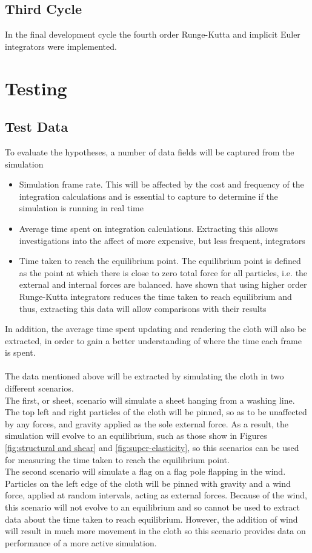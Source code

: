 \subsection{Third Cycle}
In the final development cycle the fourth order Runge-Kutta and implicit Euler integrators were implemented.

\section{Testing}

\subsection{Test Data}
To evaluate the hypotheses, a number of data fields will be captured from the simulation
\begin{itemize}
\item{Simulation frame rate. This will be affected by the cost and frequency of the integration calculations and is essential to capture to determine if the simulation is running in real time}
\item{Average time spent on integration calculations. Extracting this allows investigations into the affect of more expensive, but less frequent, integrators}
\item{Time taken to reach the equilibrium point. The equilibrium point is defined as the point at which there is close to zero total force for all particles, i.e. the external and internal forces are balanced. \textcite{Wang2009a} have shown that using higher order Runge-Kutta integrators reduces the time taken to reach equilibrium and thus, extracting this data will allow comparisons with their results}
\end{itemize}
In addition, the average time spent updating and rendering the cloth will also be extracted, in order to gain a better understanding of where the time each frame is spent.
\\\\The data mentioned above will be extracted by simulating the cloth in two different scenarios.
\\The first, or sheet, scenario will simulate a sheet hanging from a washing line. The top left and right particles of the cloth will be pinned, so as to be unaffected by any forces, and gravity applied as the sole external force. As a result, the simulation will evolve to an equilibrium, such as those show in Figures \ref{fig:structural and shear} and \ref{fig:super-elasticity}, so this scenarios can be used for measuring the time taken to reach the equilibrium point. 
\\The second scenario will simulate a flag on a flag pole flapping in the wind. Particles on the left edge of the cloth will be pinned with gravity and a wind force, applied at random intervals, acting as external forces. Because of the wind, this scenario will not evolve to an equilibrium and so cannot be used to extract data about the time taken to reach equilibrium. However, the addition of wind will result in much more movement in the cloth so this scenario provides data on performance of a more active simulation.

